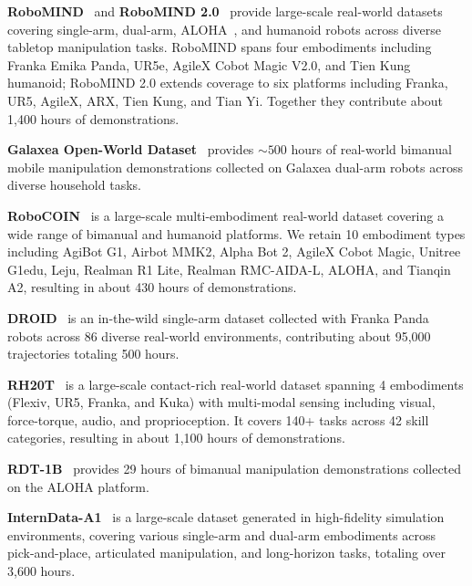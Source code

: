 \textbf{RoboMIND}~\citep{wu2024robomind} and \textbf{RoboMIND 2.0}~\citep{wu2025robomind2} provide large-scale real-world datasets covering single-arm, dual-arm, ALOHA~\citep{zhao2023aloha}, and humanoid robots across diverse tabletop manipulation tasks. RoboMIND spans four embodiments including Franka Emika Panda, UR5e, AgileX Cobot Magic V2.0, and Tien Kung humanoid; RoboMIND 2.0 extends coverage to six platforms including Franka, UR5, AgileX, ARX, Tien Kung, and Tian Yi. Together they contribute about 1,400 hours of demonstrations.


\textbf{Galaxea Open-World Dataset}~\citep{galaxea2025openworld} provides $\sim500$ hours of real-world bimanual mobile manipulation demonstrations collected on Galaxea dual-arm robots across diverse household tasks.

\textbf{RoboCOIN}~\citep{wu2025robocoin} is a large-scale multi-embodiment real-world dataset covering a wide range of bimanual and humanoid platforms.
We retain 10 embodiment types including AgiBot G1, Airbot MMK2, Alpha Bot 2, AgileX Cobot Magic, Unitree G1edu, Leju, Realman R1 Lite, Realman RMC-AIDA-L, ALOHA, and Tianqin A2, resulting in about 430 hours of demonstrations.

\textbf{DROID}~\citep{khazatsky2024droid} is an in-the-wild single-arm dataset collected with Franka Panda robots across 86 diverse real-world environments, contributing about 95,000 trajectories totaling 500 hours.

\textbf{RH20T}~\citep{fang2023rh20t} is a large-scale contact-rich real-world dataset spanning 4 embodiments (Flexiv, UR5, Franka, and Kuka) with multi-modal sensing including visual, force-torque, audio, and proprioception. 
It covers 140+ tasks across 42 skill categories, resulting in about 1,100 hours of demonstrations.

\textbf{RDT-1B}~\citep{liu2024rdt1b} provides 29 hours of bimanual manipulation demonstrations collected on the ALOHA platform.

\textbf{InternData-A1}~\citep{tian2025interndataa1} is a large-scale dataset generated in high-fidelity simulation environments, covering various single-arm and dual-arm embodiments across pick-and-place, articulated manipulation, and long-horizon tasks, totaling over 3,600 hours.




